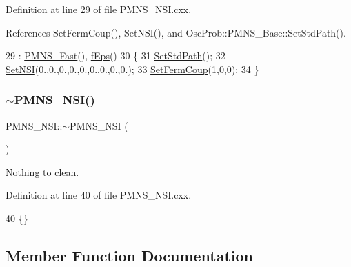 Definition at line 29 of file P\+M\+N\+S\+\_\+\+N\+S\+I.\+cxx.



References Set\+Ferm\+Coup(), Set\+N\+S\+I(), and Osc\+Prob\+::\+P\+M\+N\+S\+\_\+\+Base\+::\+Set\+Std\+Path().


\begin{DoxyCode}
29                    : \hyperlink{classOscProb_1_1PMNS__Fast_a2bbac744bf63753105d766a860af7c0d}{PMNS\_Fast}(), \hyperlink{classOscProb_1_1PMNS__NSI_ab9328cb72e868b395f3efdd75b6af5e4}{fEps}()
30 \{
31   \hyperlink{classOscProb_1_1PMNS__Base_add6533a9fc9acdfc7ae258b62570d78d}{SetStdPath}();
32   \hyperlink{classOscProb_1_1PMNS__NSI_ae8829af10bc4051e8c74c8b1bc81c88c}{SetNSI}(0.,0.,0.,0.,0.,0.,0.,0.,0.);
33   \hyperlink{classOscProb_1_1PMNS__NSI_a78983619968493630c48080bea9af05e}{SetFermCoup}(1,0,0);
34 \}
\end{DoxyCode}
\mbox{\label{classOscProb_1_1PMNS__NSI_aad1035cb0fb26994029c25b475ec3bde}} 
\subsubsection{\texorpdfstring{$\sim$\+P\+M\+N\+S\+\_\+\+N\+S\+I()}{~PMNS\_NSI()}}
{\footnotesize\ttfamily P\+M\+N\+S\+\_\+\+N\+S\+I\+::$\sim$\+P\+M\+N\+S\+\_\+\+N\+SI (\begin{DoxyParamCaption}{ }\end{DoxyParamCaption})\hspace{0.3cm}{\ttfamily [virtual]}}

Nothing to clean. 

Definition at line 40 of file P\+M\+N\+S\+\_\+\+N\+S\+I.\+cxx.


\begin{DoxyCode}
40 \{\}
\end{DoxyCode}


\subsection{Member Function Documentation}
\mbox{\label{classOscProb_1_1PMNS__Base_a887dc9d4dc569ec0cdef3933b4c60efc}} 
